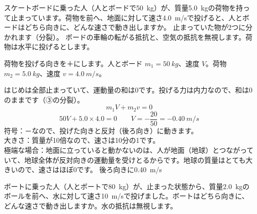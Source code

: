 \label{ph:力-3:ex5}
\begin{phreidai}[スケートボードの上から荷物を投げる]
スケートボードに乗った人（人とボードで\qty{50}{kg}）が、質量\qty{5.0}{kg}の荷物を持って止まっています。荷物を前へ、地面に対して速さ\qty{4.0}{m/s}で投げると、人とボードはどちら向きに、どんな速さで動き出しますか。
\phbamen
止まっていた物が2つに分かれます（分裂）。
\phmushi
ボードの車輪の転がる抵抗と、空気の抵抗を無視します。荷物は水平に投げるとします。
\phzu
\noindent\begin{minipage}[c]{0.5\linewidth}\centering
{}
\end{minipage}\hfill
\begin{minipage}[c]{0.47\linewidth}\raggedright
荷物を投げる向きを＋にします。人とボード $m_1=\qty{50}{kg}$、速度 $V$。荷物 $m_2=\qty{5.0}{kg}$、速度 $v=\qty{4.0}{m/s}$。
\end{minipage}
\phriyu
はじめは全部止まっていて、運動量の和は0です。投げる力は内力なので、和は0のままです（③の分裂）。
\phtateru
\[m_1V+m_2v=0\]
\phtoku
\[50V+5.0\times4.0=0\qquad V=-\frac{20}{50}=\qty{-0.40}{m/s}\]
\phtashikame
符号：－なので、投げた向きと反対（後ろ向き）に動きます。\\
大きさ：質量が10倍なので、速さは10分の1です。\\
極端な場合：地面に立っていると動かないのは、人が地面（地球）とつながっていて、地球全体が反対向きの運動量を受けとるからです。地球の質量はとても大きいので、速さはほぼ0です。
\kotae 後ろ向きに\qty{0.40}{m/s}
\end{phreidai}
\begin{jibun}
ボートに乗った人（人とボートで\qty{80}{kg}）が、止まった状態から、質量\qty{2.0}{kg}のボールを前へ、水に対して速さ\qty{10}{m/s}で投げました。ボートはどちら向きに、どんな速さで動き出しますか。水の抵抗は無視します。
\end{jibun}

